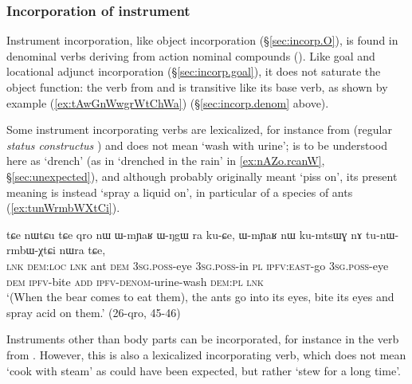 \subsubsection{Incorporation of instrument} \label{sec:incorp.instr}
Instrument incorporation, like object incorporation (§\ref{sec:incorp.O}), is found in denominal verbs deriving from action nominal compounds (). Like goal and locational adjunct incorporation (§\ref{sec:incorp.goal}), it does not saturate the object function: the verb  from  and  is transitive like its base verb, as shown by example (\ref{ex:tAwGnWwgrWtChWa}) (§\ref{sec:incorp.denom} above).

Some instrument incorporating verbs are lexicalized, for instance  from  (regular \textit{status constructus} ) and  does not mean `wash with urine';  is to be understood here as `drench' (as in `drenched in the rain' in \ref{ex:nAZo.rcanW}, §\ref{sec:unexpected}), and although  probably originally meant `piss on', its present meaning is instead `spray a liquid on', in particular of a species of ants (\ref{ex:tunWrmbWXtCi}).

\begin{exe}
\ex \label{ex:tunWrmbWXtCi}
\gll tɕe nɯtɕu tɕe qro nɯ ɯ-mɲaʁ ɯ-ŋgɯ ra ku-ɕe, ɯ-mɲaʁ nɯ ku-mtsɯɣ nɤ tu-nɯ-rmbɯ-χtɕi nɯra tɕe, \\
\textsc{lnk} \textsc{dem}:\textsc{loc} \textsc{lnk} ant \textsc{dem} \textsc{3sg}.\textsc{poss}-eye \textsc{3sg}.\textsc{poss}-in \textsc{pl} \textsc{ipfv}:\textsc{east}-go \textsc{3sg}.\textsc{poss}-eye \textsc{dem} \textsc{ipfv}-bite \textsc{add} \textsc{ipfv}-\textsc{denom}-urine-wash \textsc{dem}:\textsc{pl} \textsc{lnk}  \\
\glt `(When the bear comes to eat them), the ants go into its eyes, bite its eyes and spray acid on them.' (26-qro, 45-46)
\end{exe}

Instruments other than body parts can be incorporated, for instance  in the verb  from . However, this is also a lexicalized incorporating verb, which does not mean `cook with steam' as could have been expected, but rather `stew for a long time'. 



